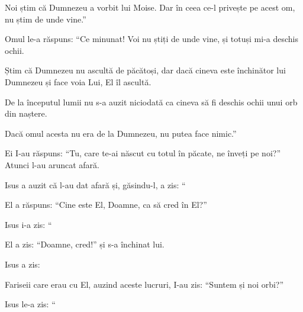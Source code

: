 {Noi știm că Dumnezeu a vorbit lui Moise. Dar în ceea ce-l privește pe acest om, nu știm de unde vine.”


\par }{\PP {}Omul le-a răspuns: “Ce minunat! Voi nu știți de unde vine, și totuși mi-a deschis ochii.

Știm că Dumnezeu nu ascultă de păcătoși, dar dacă cineva este închinător lui Dumnezeu și face voia Lui, El îl ascultă.

De la începutul lumii nu s-a auzit niciodată ca cineva să fi deschis ochii unui orb din naștere.

Dacă omul acesta nu era de la Dumnezeu, nu putea face nimic.”


\par }{\PP {}Ei I-au răspuns: “Tu, care te-ai născut cu totul în păcate, ne înveți pe noi?” Atunci l-au aruncat afară.


\par }{\PP {}Isus a auzit că l-au dat afară și, găsindu-l, a zis: “{}


\par }{\PP {}El a răspuns: “Cine este El, Doamne, ca să cred în El?”


\par }{\PP {}Isus i-a zis: “{}


\par }{\PP {}El a zis: “Doamne, cred!” și s-a închinat lui.


\par }{\PP {}Isus a zis:
{}


\par }{\PP {}Fariseii care erau cu El, auzind aceste lucruri, I-au zis: “Suntem și noi orbi?”


\par }{\PP {}Isus le-a zis: “{}



\par }
